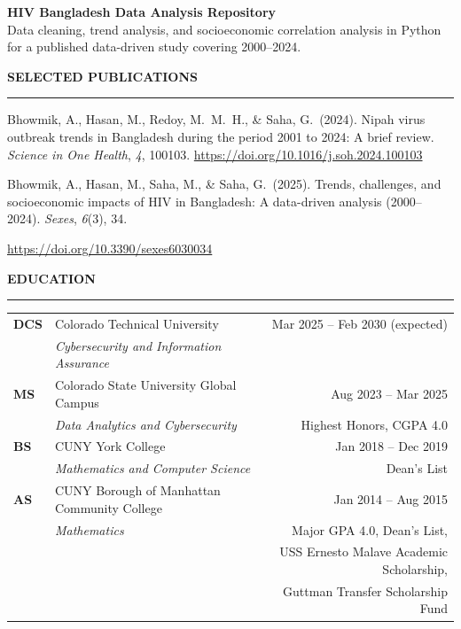 \documentclass[letterpaper, 11pt]{article}
\newcommand{\rsection}[1]{%
  \vspace{8pt}%
  {\large\textbf{#1}}\\[-5pt]%
  \rule{\textwidth}{0.5pt}%
  \vspace{3pt}%
}
\begin{document}
\vspace{4pt}
\noindent\textbf{HIV Bangladesh Data Analysis Repository}\\
Data cleaning, trend analysis, and socioeconomic correlation analysis in Python for a
published data-driven study covering 2000--2024.

\rsection{SELECTED PUBLICATIONS}

\begin{compactitem}
  \item Bhowmik, A., Hasan, M., Redoy, M.\ M.\ H., \& Saha, G.\ (2024). Nipah virus outbreak
        trends in Bangladesh during the period 2001 to 2024: A brief review.
        \textit{Science in One Health}, \textit{4}, 100103.
        \href{https://doi.org/10.1016/j.soh.2024.100103}{https://doi.org/10.1016/j.soh.2024.100103}

  \item Bhowmik, A., Hasan, M., Saha, M., \& Saha, G.\ (2025). Trends, challenges, and
        socioeconomic impacts of HIV in Bangladesh: A data-driven analysis (2000--2024).
        \textit{Sexes}, \textit{6}(3), 34.\par\noindent
        \href{https://doi.org/10.3390/sexes6030034}{https://doi.org/10.3390/sexes6030034}
\end{compactitem}

\rsection{EDUCATION}

\begin{tabularx}{\textwidth}{@{}l X r@{}}
  \textbf{DCS} & Colorado Technical University                        & Mar 2025 -- Feb 2030 (expected) \\
               & \textit{Cybersecurity and Information Assurance}      & \\[4pt]
  \textbf{MS}  & Colorado State University Global Campus              & Aug 2023 -- Mar 2025 \\
               & \textit{Data Analytics and Cybersecurity}             & Highest Honors, CGPA 4.0 \\[4pt]
  \textbf{BS}  & CUNY York College                                    & Jan 2018 -- Dec 2019 \\
               & \textit{Mathematics and Computer Science}             & Dean's List \\[4pt]
  \textbf{AS}  & CUNY Borough of Manhattan Community College          & Jan 2014 -- Aug 2015 \\
               & \textit{Mathematics}                                  & Major GPA 4.0, Dean's List, \\
               &                                                       & USS Ernesto Malave Academic Scholarship, \\
               &                                                       & Guttman Transfer Scholarship Fund \\
\end{tabularx}
\end{document}
